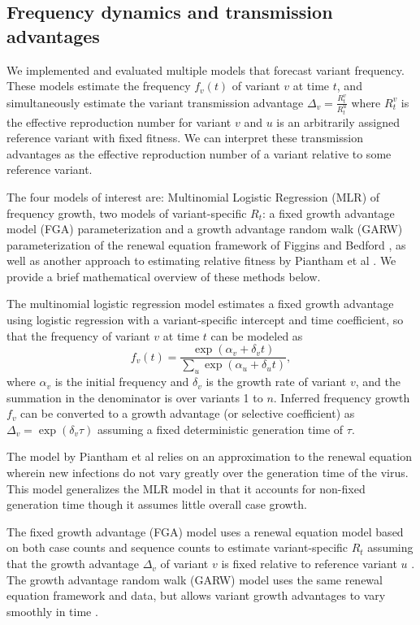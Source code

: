 \documentclass[10pt,letterpaper]{article}
\begin{document}
\subsection*{Frequency dynamics and transmission advantages}

We implemented and evaluated multiple models that forecast variant frequency.
These models estimate the frequency $f_{v}(t)$ of variant $v$ at time $t$, and simultaneously estimate the variant transmission advantage $\Delta_{v} = \frac{R_{t}^{v}}{R_{t}^{u}}$ where $R_{t}^{v}$ is the effective reproduction number for variant $v$ and $u$ is an arbitrarily assigned reference variant with fixed fitness.
We can interpret these transmission advantages as the effective reproduction number of a variant relative to some reference variant.

The four models of interest are: Multinomial Logistic Regression (MLR) of frequency growth, two models of variant-specific $R_t$: a fixed growth advantage model (FGA) parameterization and a growth advantage random walk (GARW) parameterization of the renewal equation framework of Figgins and Bedford \cite{figgins2022sars}, as well as another approach to estimating relative fitness by Piantham et al \cite{piantham2021estimating}.
We provide a brief mathematical overview of these methods below.

The multinomial logistic regression model estimates a fixed growth advantage using logistic regression with a variant-specific intercept and time coefficient, so that the frequency of variant $v$ at time $t$ can be modeled as
\begin{equation}
    f_{v}(t) = \frac{\exp(\alpha_{v} + \delta_{v} t)}{\sum_{u} \exp(\alpha_{u} + \delta_{u} t)},
\end{equation}
where $\alpha_v$ is the initial frequency and $\delta_v$ is the growth rate of variant $v$, and the summation in the denominator is over variants 1 to $n$.
Inferred frequency growth $f_v$ can be converted to a growth advantage (or selective coefficient) as $\Delta_{v} = \exp(\delta_{v} \tau)$ assuming a fixed deterministic  generation time of $\tau$.

The model by Piantham et al \cite{piantham2021estimating} relies on an approximation to the renewal equation wherein new infections do not vary greatly over the generation time of the virus.
This model generalizes the MLR model in that it accounts for non-fixed generation time though it assumes little overall case growth.

The fixed growth advantage (FGA) model uses a renewal equation model based on both case counts and sequence counts to estimate variant-specific $R_t$ assuming that the growth advantage $\Delta_{v}$ of variant $v$ is fixed relative to reference variant $u$ \cite{figgins2022sars}.
The growth advantage random walk (GARW) model uses the same renewal equation framework and data, but allows variant growth advantages to vary smoothly in time \cite{figgins2022sars}.
\end{document}
